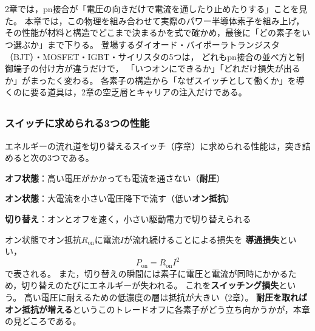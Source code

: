 \chapter{}
\label{chap3}

2章では，pn接合が「電圧の向きだけで電流を通したり止めたりする」ことを見た。
本章では，この物理を組み合わせて実際のパワー半導体素子を組み上げ，
その性能が材料と構造でどこまで決まるかを式で確かめ，最後に「どの素子をいつ選ぶか」まで下りる。
登場するダイオード・バイポーラトランジスタ（BJT）・MOSFET・IGBT・サイリスタの5つは，
どれもpn接合の並べ方と制御端子の付け方が違うだけで，
「いつオンにできるか」「どれだけ損失が出るか」がまったく変わる。
各素子の構造から「なぜスイッチとして働くか」を導くのに要る道具は，2章の空乏層とキャリアの注入だけである。

\section{}
\label{sec3.1}

\subsection{スイッチに求められる3つの性能}

エネルギーの流れ道を切り替えるスイッチ（序章）に求められる性能は，突き詰めると次の3つである。

\begin{箇条書}
\item \textbf{オフ状態}：高い電圧がかかっても電流を通さない（\textbf{耐圧}）
\item \textbf{オン状態}：大電流を小さい電圧降下で流す（低い\textbf{オン抵抗}）
\item \textbf{切り替え}：オンとオフを速く，小さい駆動電力で切り替えられる
\end{箇条書}

オン状態でオン抵抗$R_{\mathrm{on}}$に電流$I$が流れ続けることによる損失を
\textbf{導通損失}といい，
\begin{equation}
P_{\mathrm{on}} = R_{\mathrm{on}} I^2
\label{eq3.1}
\end{equation}
で表される。
また，切り替えの瞬間には素子に電圧と電流が同時にかかるため，切り替えのたびにエネルギーが失われる。
これを\textbf{スイッチング損失}という。
高い電圧に耐えるための低濃度の層は抵抗が大きい（2章）。
\textbf{耐圧を取ればオン抵抗が増える}というこのトレードオフに各素子がどう立ち向かうかが，本章の見どころである。

